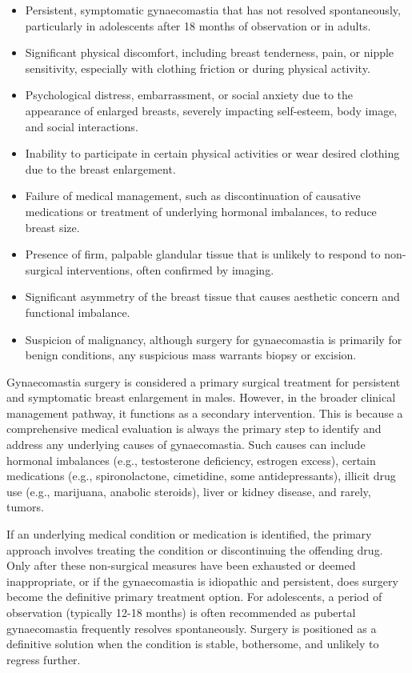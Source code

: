 \begin{itemize}
  \item Persistent, symptomatic gynaecomastia that has not resolved spontaneously, particularly in adolescents after 18 months of observation or in adults.
  \item Significant physical discomfort, including breast tenderness, pain, or nipple sensitivity, especially with clothing friction or during physical activity.
  \item Psychological distress, embarrassment, or social anxiety due to the appearance of enlarged breasts, severely impacting self-esteem, body image, and social interactions.
  \item Inability to participate in certain physical activities or wear desired clothing due to the breast enlargement.
  \item Failure of medical management, such as discontinuation of causative medications or treatment of underlying hormonal imbalances, to reduce breast size.
  \item Presence of firm, palpable glandular tissue that is unlikely to respond to non-surgical interventions, often confirmed by imaging.
  \item Significant asymmetry of the breast tissue that causes aesthetic concern and functional imbalance.
  \item Suspicion of malignancy, although surgery for gynaecomastia is primarily for benign conditions, any suspicious mass warrants biopsy or excision.
\end{itemize}

Gynaecomastia surgery is considered a primary surgical treatment for persistent and symptomatic breast enlargement in males. However, in the broader clinical management pathway, it functions as a secondary intervention. This is because a comprehensive medical evaluation is always the primary step to identify and address any underlying causes of gynaecomastia. Such causes can include hormonal imbalances (e.g., testosterone deficiency, estrogen excess), certain medications (e.g., spironolactone, cimetidine, some antidepressants), illicit drug use (e.g., marijuana, anabolic steroids), liver or kidney disease, and rarely, tumors.

If an underlying medical condition or medication is identified, the primary approach involves treating the condition or discontinuing the offending drug. Only after these non-surgical measures have been exhausted or deemed inappropriate, or if the gynaecomastia is idiopathic and persistent, does surgery become the definitive primary treatment option. For adolescents, a period of observation (typically 12-18 months) is often recommended as pubertal gynaecomastia frequently resolves spontaneously. Surgery is positioned as a definitive solution when the condition is stable, bothersome, and unlikely to regress further.

